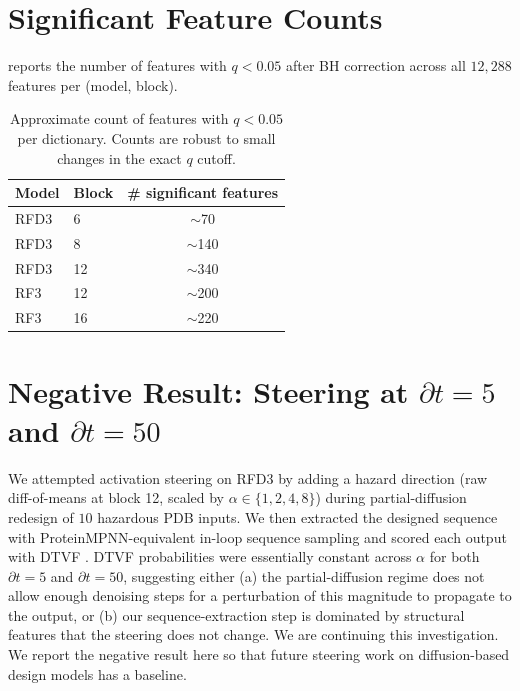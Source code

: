 \documentclass{article}
\theoremstyle{plain}
\theoremstyle{definition}
\theoremstyle{remark}
\begin{document}
\section{Significant Feature Counts}
\label{app:sigfeat}

 reports the number of features with $q < 0.05$ after BH correction across all $12{,}288$ features per (model, block).

\begin{table}[h]
\centering
\begin{tabular}{llc}
\toprule
Model & Block & \# significant features \\
\midrule
RFD3 & 6  & $\sim$70 \\
RFD3 & 8  & $\sim$140 \\
RFD3 & 12 & $\sim$340 \\
RF3  & 12 & $\sim$200 \\
RF3  & 16 & $\sim$220 \\
\bottomrule
\end{tabular}
\caption{Approximate count of features with $q < 0.05$ per dictionary. Counts are robust to small changes in the exact $q$ cutoff.}
\label{tab:sig_counts}
\end{table}

\section{Negative Result: Steering at $\partial t = 5$ and $\partial t = 50$}
\label{app:steering}

We attempted activation steering on RFD3 by adding a hazard direction (raw diff-of-means at block 12, scaled by $\alpha \in \{1, 2, 4, 8\}$) during partial-diffusion redesign of $10$ hazardous PDB inputs. We then extracted the designed sequence with ProteinMPNN-equivalent in-loop sequence sampling and scored each output with DTVF \cite{sun2024dtvf}. DTVF probabilities were essentially constant across $\alpha$ for both $\partial t = 5$ and $\partial t = 50$, suggesting either (a) the partial-diffusion regime does not allow enough denoising steps for a perturbation of this magnitude to propagate to the output, or (b) our sequence-extraction step is dominated by structural features that the steering does not change. We are continuing this investigation. We report the negative result here so that future steering work on diffusion-based design models has a baseline.
\end{document}

